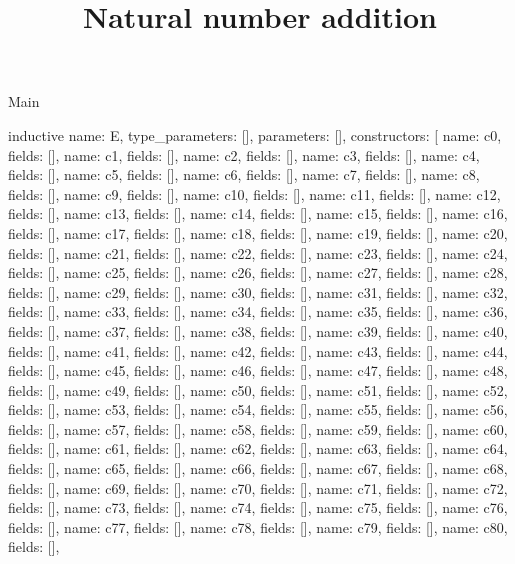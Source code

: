 \begin{lexlean}{Main}
\title{Natural number addition}
\begin{semanticmodule}
inductive{
  name: E,
  type_parameters: [],
  parameters: [],
  constructors: [
    {name: c0, fields: []},
    {name: c1, fields: []},
    {name: c2, fields: []},
    {name: c3, fields: []},
    {name: c4, fields: []},
    {name: c5, fields: []},
    {name: c6, fields: []},
    {name: c7, fields: []},
    {name: c8, fields: []},
    {name: c9, fields: []},
    {name: c10, fields: []},
    {name: c11, fields: []},
    {name: c12, fields: []},
    {name: c13, fields: []},
    {name: c14, fields: []},
    {name: c15, fields: []},
    {name: c16, fields: []},
    {name: c17, fields: []},
    {name: c18, fields: []},
    {name: c19, fields: []},
    {name: c20, fields: []},
    {name: c21, fields: []},
    {name: c22, fields: []},
    {name: c23, fields: []},
    {name: c24, fields: []},
    {name: c25, fields: []},
    {name: c26, fields: []},
    {name: c27, fields: []},
    {name: c28, fields: []},
    {name: c29, fields: []},
    {name: c30, fields: []},
    {name: c31, fields: []},
    {name: c32, fields: []},
    {name: c33, fields: []},
    {name: c34, fields: []},
    {name: c35, fields: []},
    {name: c36, fields: []},
    {name: c37, fields: []},
    {name: c38, fields: []},
    {name: c39, fields: []},
    {name: c40, fields: []},
    {name: c41, fields: []},
    {name: c42, fields: []},
    {name: c43, fields: []},
    {name: c44, fields: []},
    {name: c45, fields: []},
    {name: c46, fields: []},
    {name: c47, fields: []},
    {name: c48, fields: []},
    {name: c49, fields: []},
    {name: c50, fields: []},
    {name: c51, fields: []},
    {name: c52, fields: []},
    {name: c53, fields: []},
    {name: c54, fields: []},
    {name: c55, fields: []},
    {name: c56, fields: []},
    {name: c57, fields: []},
    {name: c58, fields: []},
    {name: c59, fields: []},
    {name: c60, fields: []},
    {name: c61, fields: []},
    {name: c62, fields: []},
    {name: c63, fields: []},
    {name: c64, fields: []},
    {name: c65, fields: []},
    {name: c66, fields: []},
    {name: c67, fields: []},
    {name: c68, fields: []},
    {name: c69, fields: []},
    {name: c70, fields: []},
    {name: c71, fields: []},
    {name: c72, fields: []},
    {name: c73, fields: []},
    {name: c74, fields: []},
    {name: c75, fields: []},
    {name: c76, fields: []},
    {name: c77, fields: []},
    {name: c78, fields: []},
    {name: c79, fields: []},
    {name: c80, fields: []},
}
\end{semanticmodule}
\end{lexlean}
